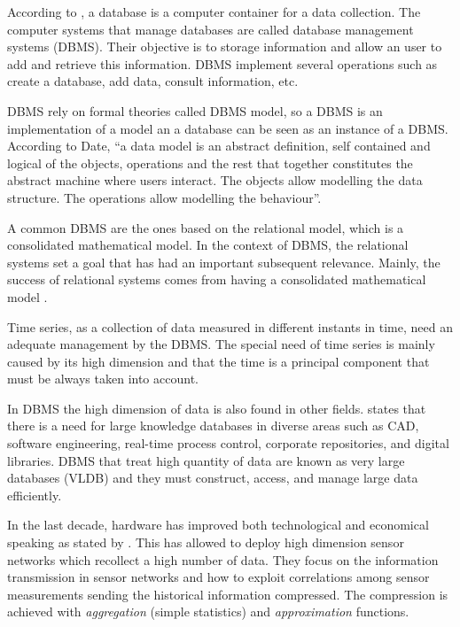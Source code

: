 According to \textcite{date}, a database is a computer container for a data collection. The computer systems that manage databases are called database management systems (DBMS). Their objective is to storage information and allow an user to add and retrieve this information. DBMS implement several operations such as create a database, add data, consult information, etc.

DBMS rely on formal theories called DBMS model, so a DBMS is an implementation of a model an a database can be seen as an instance of a DBMS. According to Date, ``a data model is an abstract definition, self contained and logical of the objects, operations and the rest that together constitutes the abstract machine where users interact. The objects allow modelling the data structure. The operations allow modelling the behaviour''.

A common DBMS are the ones based on the relational model, which is a consolidated mathematical model. In the context of DBMS, the relational systems set a goal that has had an important subsequent relevance. Mainly, the success of relational systems comes from having a consolidated mathematical model \parencite{date}.

Time series, as a collection of data measured in different instants in time, need an adequate management by the DBMS. The special need of time series is mainly caused by its high dimension and that the time is a principal component that must be always taken into account. 
 


In DBMS the high dimension of data is also found in other fields. \textcite{mylopoulos96} states that there is a need for large knowledge databases in diverse areas such as CAD, software engineering, real-time process control, corporate repositories, and digital libraries. DBMS that treat high quantity of data are known as very large databases (VLDB) and they must construct, access, and manage large data efficiently.

In the last decade, hardware has improved both technological and economical speaking as stated by \textcite{deligiannakis07}. This has allowed to deploy high dimension sensor networks which recollect a high number of data. They focus on the information transmission in sensor networks and how to exploit correlations among sensor measurements sending the historical information compressed. The compression is achieved with \emph{aggregation} (simple statistics) and \emph{approximation} functions. 


